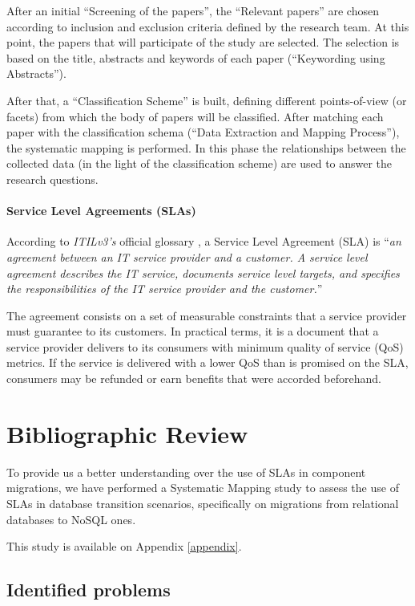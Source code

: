 \documentclass{article}
\begin{document}
After an initial ``Screening of the papers'', the ``Relevant papers'' are chosen according to inclusion and exclusion criteria defined by the research team. 
At this point, the papers that will participate of the study are selected. 
The selection is based on the title, abstracts and keywords of each paper (``Keywording using Abstracts'').

After that, a ``Classification Scheme'' is built, defining different points-of-view (or facets) from which the body of papers will be classified. 
After matching each paper with the classification schema (``Data Extraction and Mapping Process''), the  systematic mapping is performed.
In this phase the relationships between the collected data (in the light of the classification scheme) are used to answer the research questions.


\paragraph*{Service Level Agreements (SLAs)}
According to \textit{ITILv3's} official glossary \cite{itilv3glossary}, a Service Level Agreement (SLA) is ``\textit{an agreement between an IT service provider and a customer. 
A service level agreement describes the IT service, documents service level targets, and specifies the responsibilities of the IT service provider and the customer.}'' 

The agreement consists on a set of measurable constraints that a service provider must guarantee to its customers.
In practical terms, it is a document that a service provider delivers to its consumers with minimum quality of service (QoS) metrics. 
If the service is delivered with a lower QoS than is promised on the SLA, consumers may be refunded or earn benefits that were accorded beforehand.    

\section{Bibliographic Review}\label{bibreview}

To provide us a better understanding over the use of SLAs in component migrations, we have performed a Systematic Mapping study to assess the use of SLAs in database transition scenarios, specifically on migrations from relational databases to NoSQL ones. 

This study is available on Appendix \ref{appendix}. 

\subsection{Identified problems}
\end{document}

